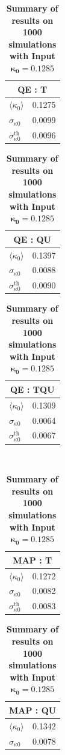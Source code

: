 \documentclass[prd, superscriptaddress, tightenlines, longbibliography, nofootinbib, eqsecnum, amsfonts, amsmath, floatfix, twocolumn, notitlepage]{revtex4-2}
\newcommand{\bs}[1]{\boldsymbol{#1}}
\begin{document}
\begin{table}
\centering
\hspace*{1.0cm} 
\caption{\textbf{Summary of results on 1000 simulations with Input $\bs{\kappa_0 = 0.1285}$}}
    \begin{tabularx}{0.15\textwidth}{|X|X|}
    \hline
    \multicolumn{2}{|c|}{QE : T} \\ \hline
    $\langle\kappa_0 \rangle$      & 0.1275   \\ \hline
    $\sigma_{\kappa 0}$ & 0.0099  \\\hline
    $\sigma_{\kappa 0}^{\text{th}}$ & 0.0096  \\\hline
    \end{tabularx}
    \begin{tabularx}{0.15\textwidth}{|X|X|}
    \hline
    \multicolumn{2}{|c|}{QE : QU} \\ \hline
    $\langle\kappa_0 \rangle$      & 0.1397   \\ \hline
    $\sigma_{\kappa 0}$ & 0.0088  \\\hline
    $\sigma_{\kappa 0}^{\text{th}}$ & 0.0090  \\\hline
    \end{tabularx}
    \begin{tabularx}{0.15\textwidth}{|X|X|}
    \hline
    \multicolumn{2}{|c|}{QE : TQU} \\ \hline
    $\langle\kappa_0 \rangle$      & 0.1309   \\ \hline
    $\sigma_{\kappa 0}$ & 0.0064  \\\hline
    $\sigma_{\kappa 0}^{\text{th}}$ & 0.0067  \\\hline
    \end{tabularx} \\ 
    \begin{tabularx}{0.15\textwidth}{|X|X|}
    \hline
    \multicolumn{2}{|c|}{MAP : T} \\ \hline
    $\langle\kappa_0 \rangle$      & 0.1272   \\ \hline
    $\sigma_{\kappa 0}$ & 0.0082  \\\hline
    $\sigma_{\kappa 0}^{\text{th}}$ & 0.0083  \\\hline
    \end{tabularx}
    \begin{tabularx}{0.15\textwidth}{|X|X|}
    \hline
    \multicolumn{2}{|c|}{MAP : QU} \\ \hline
    $\langle\kappa_0 \rangle$      & 0.1342   \\ \hline
    $\sigma_{\kappa 0}$ & 0.0078  \\\hline

\end{tabularx}
\end{table}
\end{document}
